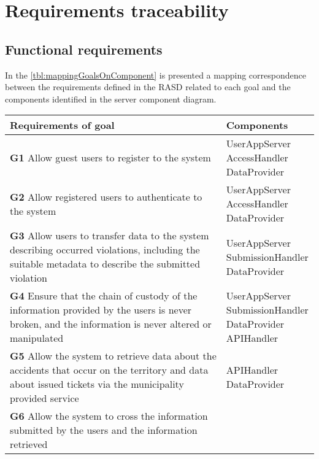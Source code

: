 \section{Requirements traceability}

    \subsection{Functional requirements}

        In the \autoref{tbl:mappingGoalsOnComponent} is presented a mapping correspondence between the requirements defined in the RASD
        related to each goal and the components identified in the server component diagram.\\

        \begin{longtable}{p{0.7\linewidth}p{0.3\linewidth}}
            \toprule
                \textbf{Requirements of goal} & \textbf{Components}\\
            \midrule
                \textbf{G1} Allow guest users to register to the system 
                    & \mbox{UserAppServer} \mbox{AccessHandler} \mbox{DataProvider}\\
            \midrule
                \textbf{G2} Allow registered users to authenticate to the system 
                    & \mbox{UserAppServer} \mbox{AccessHandler} \mbox{DataProvider}\\
            \midrule 
                \textbf{G3} Allow users to transfer data to the system describing occurred violations,
                 including the suitable metadata to describe the submitted violation 
                 & \mbox{UserAppServer} \mbox{SubmissionHandler} \mbox{DataProvider}\\
            \midrule
                \textbf{G4} Ensure that the chain of custody of the information provided by the users is never broken, 
                and the information is never altered or manipulated 
                & \mbox{UserAppServer} \mbox{SubmissionHandler} \mbox{DataProvider}  \mbox{APIHandler}\\
            \midrule
                \textbf{G5} Allow the system to retrieve data about the accidents that occur on the territory and data 
                about issued tickets via the municipality provided service 
                & \mbox{APIHandler} \mbox{DataProvider}\\
            \midrule
                \textbf{G6} Allow the system to cross the information submitted by the users and the information retrieved 

\end{longtable}
